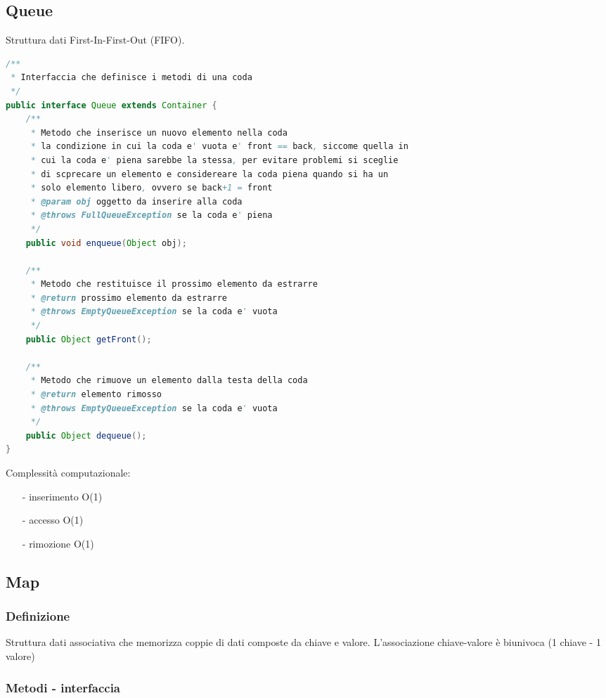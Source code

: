 \documentclass{article}
\begin{document}
\newpage

\subsection{Queue}
Struttura dati First-In-First-Out (FIFO).
\begin{lstlisting}[language=Java]
/**
 * Interfaccia che definisce i metodi di una coda
 */
public interface Queue extends Container {
	/**
	 * Metodo che inserisce un nuovo elemento nella coda
	 * la condizione in cui la coda e' vuota e' front == back, siccome quella in
	 * cui la coda e' piena sarebbe la stessa, per evitare problemi si sceglie
	 * di scprecare un elemento e considereare la coda piena quando si ha un
	 * solo elemento libero, ovvero se back+1 = front
	 * @param obj oggetto da inserire alla coda
	 * @throws FullQueueException se la coda e' piena
	 */
	public void enqueue(Object obj);

	/**
	 * Metodo che restituisce il prossimo elemento da estrarre
	 * @return prossimo elemento da estrarre
	 * @throws EmptyQueueException se la coda e' vuota
	 */
	public Object getFront();
	
	/**
	 * Metodo che rimuove un elemento dalla testa della coda
	 * @return elemento rimosso
	 * @throws EmptyQueueException se la coda e' vuota
	 */
	public Object dequeue();
}   
\end{lstlisting}

Complessità computazionale:
\begin{itemize} [topsep=3pt, itemsep=0pt]
	\item[-] inserimento O(1)
	\item[-] accesso O(1)
	\item[-] rimozione O(1)
\end{itemize}


\subsection{Map}
\subsubsection*{Definizione}
Struttura dati associativa che memorizza coppie di dati composte da chiave e valore.
L'associazione chiave-valore è biunivoca (1 chiave - 1 valore)

\subsubsection*{Metodi - interfaccia}
\end{document}
